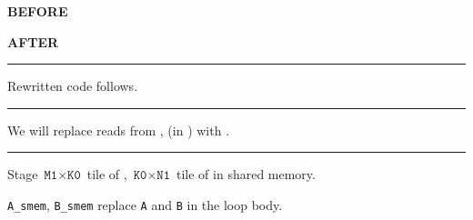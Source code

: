 \begin{minipage}[t]{0.48\textwidth}\fixminipage
{\LARGE
\textbf{BEFORE}
}

{\large

}
\end{minipage}
\hfill
\begin{minipage}[t]{0.48\textwidth}\fixminipage
{\LARGE
\textbf{AFTER}
}

{\large

}
\end{minipage}

\vspace{3mm}
\hrule

{\LARGE
Rewritten code follows.

}



\newpage
{\large

}

\newpage
{\large

}

\newpage
{\large

}

\newpage
{\large

}

\newpage
{}

{\large

}

\vspace{3mm}
\hrule

{\LARGE
We will replace reads from ,  (in ) with .

}
\vspace{-4mm}

\begin{center}
\Large
\begin{tikzpicture}[node distance=0mm]

\end{tikzpicture}
\end{center}


\newpage
{}

{\large

}

\vspace{3mm}
\hrule

{\LARGE
Stage $\texttt{M1} \times \texttt{K0}$ tile of , $\texttt{K0} \times \texttt{N1}$ tile of  in shared memory.

\texttt{A\_smem}, \texttt{B\_smem} replace \texttt{A} and \texttt{B} in the loop body.

}

